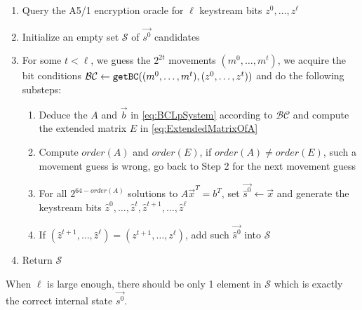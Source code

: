 \begin{enumerate}
  \item Query the A5/1 encryption oracle for $\ell$ keystream bits $z^0,\ldots, z^{\ell}$
  \item Initialize an empty set $\mathcal{S}$ of $\vec{s^0}$ candidates
  \item For some $t<\ell$, we guess the $2^{2t}$ movements $(m^0,\ldots, m^t)$, we acquire the bit conditions $\mathcal{BC}\leftarrow {\tt getBC}((m^0,\ldots, m^t), (z^0,\ldots, z^t))$ and do the following substeps:
      \begin{enumerate}
        \item Deduce the $A$ and $\vec b$ in \eqref{eq:BCLpSystem} according to $\mathcal{BC}$ and compute the extended matrix $E$ in \eqref{eq:ExtendedMatrixOfA}
        \item Compute $order(A)$ and $order(E)$, if $order(A)\neq order(E)$, such a movement guess is wrong, go back to Step 2 for the next movement guess
        \item For all $2^{64-order(A)}$ solutions to $A\vec x^T=b^T$, set $\vec{\hat{s}^0}\leftarrow \vec x$ and generate the keystream bits $\hat{z}^0,\ldots, \hat{z}^t,\hat{z}^{t+1},\ldots, \hat{z}^{\ell}$
        \item If $(\hat{z}^{t+1},\ldots, \hat{z}^{\ell})=(z^{t+1},\ldots, z^{\ell})$, add such $\vec{\hat{s}^0}$ into $\mathcal{S}$
      \end{enumerate}
  \item Return $\mathcal{S}$
\end{enumerate}
When $\ell$ is large enough, there should be only 1 element in $\mathcal{S}$ which is exactly the correct internal state $\vec{s^0}$.

